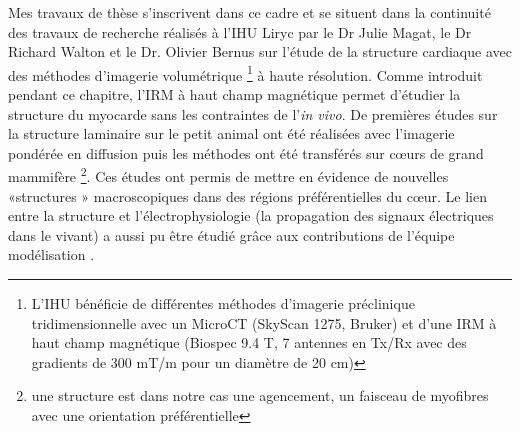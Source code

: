 Mes travaux de thèse s’inscrivent dans ce cadre et se situent dans la continuité des travaux de recherche réalisés à l’IHU Liryc par le Dr Julie Magat, le Dr Richard Walton et le Dr. Olivier Bernus sur l’étude de la structure cardiaque avec des méthodes d’imagerie volumétrique \footnote{ L’IHU bénéficie de différentes méthodes d’imagerie préclinique tridimensionnelle avec un MicroCT (SkyScan 1275, Bruker) et d’une IRM à haut champ magnétique (Biospec 9.4 T, 7 antennes en Tx/Rx avec des gradients de 300 mT/m pour un diamètre de 20 cm)} à haute résolution. Comme introduit pendant ce chapitre, l’IRM à haut champ magnétique permet d’étudier la structure du myocarde sans les contraintes de l’\textit{in vivo}. De premières études sur la structure laminaire sur le petit animal \cite{Bernus2015} ont été réalisées avec l’imagerie pondérée en diffusion puis les méthodes ont été transférés sur cœurs de grand mammifère \cite{Magat2022} \footnote{une structure est dans notre cas une agencement, un faisceau de myofibres avec une orientation préférentielle}. Ces études ont permis de mettre en évidence de nouvelles «structures » macroscopiques dans des régions préférentielles du cœur. Le lien entre la structure et l’électrophysiologie (la propagation des signaux électriques dans le vivant) a aussi pu être étudié grâce aux contributions de l’équipe modélisation \cite{RodrguezPadilla2022}.

